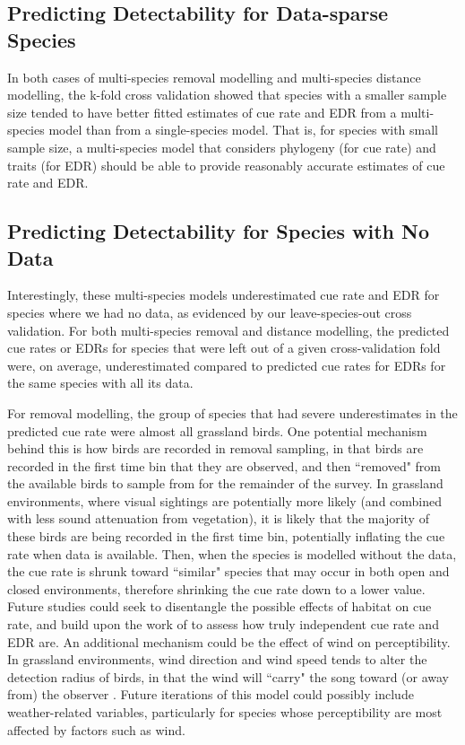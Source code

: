 \subsection{Predicting Detectability for Data-sparse Species}

\par In both cases of multi-species removal modelling and multi-species distance modelling, the k-fold cross validation showed that species with a smaller sample size tended to have better fitted estimates of cue rate and EDR from a multi-species model than from a single-species model.
That is, for species with small sample size, a multi-species model that considers phylogeny (for cue rate) and traits (for EDR) should be able to provide reasonably accurate estimates of cue rate and EDR.

\subsection{Predicting Detectability for Species with No Data}\label{discussion-nodata}

\par Interestingly, these multi-species models underestimated cue rate and EDR for species where we had no data, as evidenced by our leave-species-out cross validation.
For both multi-species removal and distance modelling, the predicted cue rates or EDRs for species that were left out of a given cross-validation fold were, on average, underestimated compared to predicted cue rates for EDRs for the same species with all its data.

\par For removal modelling, the group of species that had severe underestimates in the predicted cue rate were almost all grassland birds.
One potential mechanism behind this is how birds are recorded in removal sampling, in that birds are recorded in the first time bin that they are observed, and then ``removed" from the available birds to sample from for the remainder of the survey.
In grassland environments, where visual sightings are potentially more likely (and combined with less sound attenuation from vegetation), it is likely that the majority of these birds are being recorded in the first time bin, potentially inflating the cue rate when data is available.
Then, when the species is modelled without the data, the cue rate is shrunk toward ``similar" species that may occur in both open and closed environments, therefore shrinking the cue rate down to a lower value.
Future studies could seek to disentangle the possible effects of habitat on cue rate, and build upon the work of \citet{martin-schwarze_joint_2021} to assess how truly independent cue rate and EDR are.
An additional mechanism could be the effect of wind on perceptibility.
In grassland environments, wind direction and wind speed tends to alter the detection radius of birds, in that the wind will ``carry" the song toward (or away from) the observer \citep{rigby_factors_2019}.
Future iterations of this model could possibly include weather-related variables, particularly for species whose perceptibility are most affected by factors such as wind.


